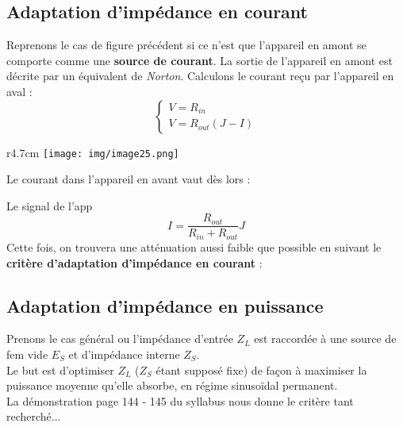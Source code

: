 \documentclass[british,french,11pt, a4paper, openany]{book}
\begin{document}
		
		\subsection{Adaptation d'impédance en courant}
		Reprenons le cas de figure précédent si ce n'est que l'appareil en amont se comporte comme une \textbf{source de courant}. La sortie de l'appareil en amont est décrite par un équivalent de \textit{Norton}. Calculons le courant reçu  par l'appareil en aval :
		\begin{equation}
		\left\{\begin{array}{l}
		V = R_{in}\\
		V = R_{out}(J-I)
		\end{array}\right.
		\end{equation}
		\begin{wrapfigure}[6]{r}{4.7cm}
			\texttt{[image: img/image25.png]}
		\end{wrapfigure}
		Le courant dans l'appareil en avant vaut dès lors :
		
		Le signal de l'app
		\begin{equation}
		I = \frac{R_{out}}{R_{in} + R_{out}}J
		\end{equation}
		Cette fois, on trouvera une atténuation aussi faible que possible en suivant le \textbf{critère d'adaptation d'impédance en courant} :\\
		
		
		\subsection{Adaptation d'impédance en puissance}
		Prenons le cas général ou l'impédance d'entrée $Z_L$ est raccordée à une source de fem vide \underline{$E_S$} et d'impédance interne $Z_S$.\\
		Le but est d'optimiser $Z_L$ ($Z_S$ étant supposé fixe) de façon à maximiser la puissance moyenne qu'elle absorbe, en régime sinusoïdal permanent.\\
		La démonstration page 144 - 145 du syllabus nous donne le critère tant recherché...\\
		
		
\end{document}
